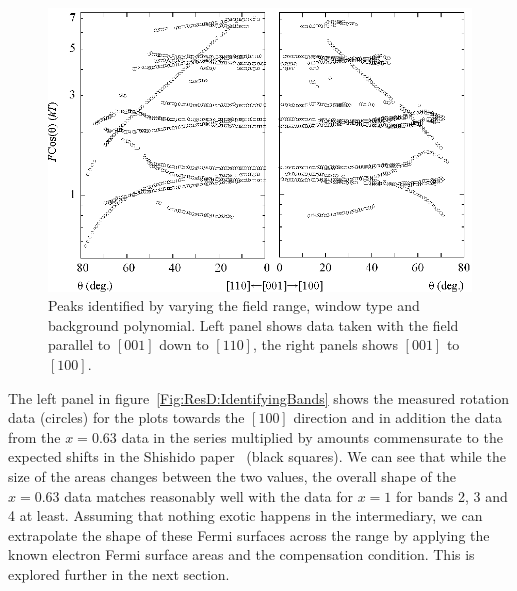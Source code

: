 \begin{figure}[htbp]
    \begin{center}
        \includegraphics[scale=0.9]{Chapter-dHvABaFe2P2/Figures/AngleDepMeasurements/AngleSweepMeasured/AngleSweepMeasured}
        \caption{Peaks identified by varying the field range, window type and background polynomial. Left panel shows data taken with the field parallel to $[001]$ down to $[110]$, the right panels shows $[001]$ to $[100]$.}
        \label{Fig:ResD:AngleSweepMeasured}
    \end{center}
\end{figure}

The left panel in figure~\ref{Fig:ResD:IdentifyingBands} shows the measured rotation data (circles) for the plots towards the $[100]$ direction and in addition the data from the $x=0.63$ data in the \BaFeAsP{} series multiplied by amounts commensurate to the expected shifts in the Shishido paper~\cite{Shishido2010} (black squares). We can see that while the size of the areas changes between the two values, the overall shape of the $x=0.63$ data matches reasonably well with the data for $x=1$ for bands 2, 3 and 4 at least. Assuming that nothing exotic happens in the intermediary, we can extrapolate the shape of these Fermi surfaces across the range by applying the known electron Fermi surface areas and the compensation condition. This is explored further in the next section.

